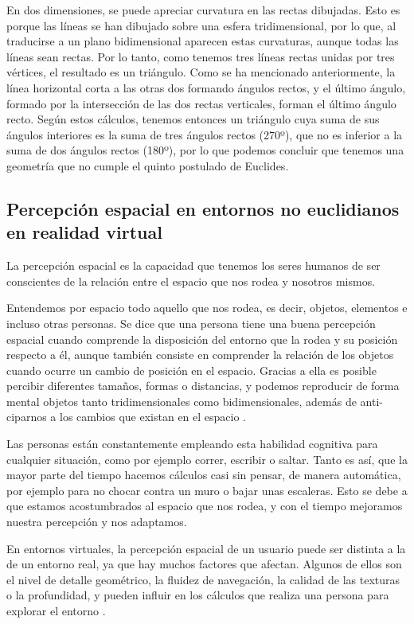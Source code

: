 \documentclass[../main.tex]{subfiles}
\begin{document}
En dos dimensiones, se puede apreciar curvatura en las rectas dibujadas. Esto es porque las líneas se han dibujado sobre una esfera tridimensional, por lo que, al traducirse a un plano bidimensional aparecen estas curvaturas, aunque todas las líneas sean rectas. Por lo tanto, como tenemos tres líneas rectas unidas por tres vértices, el resultado es un triángulo. Como se ha mencionado anteriormente, la línea horizontal corta a las otras dos formando ángulos rectos, y el último ángulo, formado por la intersección de las dos rectas verticales, forman el último ángulo recto. Según estos cálculos, tenemos entonces un triángulo cuya suma de sus ángulos interiores es la suma de tres ángulos rectos (270º), que no es inferior a la suma de dos ángulos rectos (180º), por lo que podemos concluir que tenemos una geometría que no cumple el quinto postulado de Euclides.

\subsection{Percepción espacial en entornos no euclidianos en realidad virtual}

La percepción espacial es la capacidad que tenemos los seres humanos de ser conscientes de la relación entre el espacio que nos rodea y nosotros mismos.

Entendemos por espacio todo aquello que nos rodea, es decir, objetos, elementos e incluso otras personas. Se dice que una persona tiene una buena percepción espacial cuando comprende la disposición del entorno que la rodea y su posición respecto a él, aunque también consiste en comprender la relación de los objetos cuando ocurre un cambio de posición en el espacio. Gracias a ella es posible percibir diferentes tamaños, formas o distancias, y podemos reproducir de forma mental objetos tanto tridimensionales como bidimensionales, además de anti- ciparnos a los cambios que existan en el espacio \cite{Spacial_Perception}.

Las personas están constantemente empleando esta habilidad cognitiva para cualquier situación, como por ejemplo correr, escribir o saltar. Tanto es así, que la mayor parte del tiempo hacemos cálculos casi sin pensar, de manera automática, por ejemplo para no chocar contra un muro o bajar unas escaleras. Esto se debe a que estamos acostumbrados al espacio que nos rodea, y con el tiempo mejoramos nuestra percepción y nos adaptamos.

En entornos virtuales, la percepción espacial de un usuario puede ser distinta a la de un entorno real, ya que hay muchos factores que afectan. Algunos de ellos son el nivel de detalle geométrico, la fluidez de navegación, la calidad de las texturas o la profundidad, y pueden influir en los cálculos que realiza una persona para explorar el entorno \cite{Spacial_Perception_on_Games}.
\end{document}
